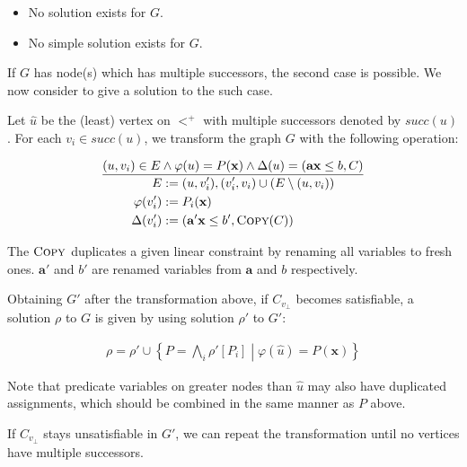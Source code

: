 \documentclass[a4paper,12pt]{article}
\begin{document}
\begin{itemize}
\item No solution exists for $G$.
\item No simple solution exists for $G$.
\end{itemize}

If $G$ has node(s) which has multiple successors, the second case is
possible. We now consider to give a solution to the such case.

Let $\hat u$ be the (least) vertex on $<^+$ with multiple successors
denoted by $succ(u)$. For each $v_i \in succ(u)$, we transform the graph
$G$ with the following operation:

\begin{align*}
\frac{
(u, v_i) \in E \wedge \varphi(u) = P(\mathbf{x}) \wedge
\Delta(u) = \left( \mathbf{a} \mathbf{x} \leq b, C \right)
}{
\begin{aligned}
E & := { (u, v_i'), (v_i', v_i) } \cup ( E \setminus (u, v_i) ) \\
\varphi(v_i') & := P_i(\mathbf{x}) \\
\Delta(v_i') & := \left( \mathbf{a}' \mathbf{x} \leq b', \textsc{Copy}(C) \right)
\end{aligned}
}
\end{align*}

The $\textsc{Copy}$ duplicates a given linear constraint by renaming
all variables to fresh ones. $\mathbf{a'}$ and $b'$ are renamed
variables from $\mathbf{a}$ and $b$ respectively.

Obtaining $G'$ after the transformation above, if $C_{v_\bot}$ becomes
satisfiable, a solution $\rho$ to $G$ is given by using solution
$\rho'$ to $G'$:

\begin{align*}
 \rho = \rho' \cup \left\lbrace P = \bigwedge_i \rho'[P_i] \middle|
 \varphi(\hat u) = P(\mathbf{x}) \right\rbrace
\end{align*}

Note that predicate variables on greater nodes than $\hat u$ may
also have duplicated assignments, which should be combined in the
same manner as $P$ above.

If $C_{v_\bot}$ stays unsatisfiable in $G'$, we can repeat the
transformation until no vertices have multiple successors.
\end{document}
